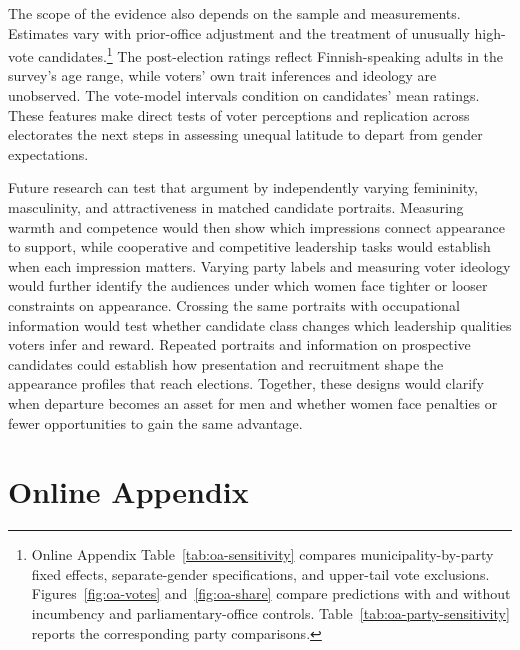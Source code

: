 \documentclass[11pt,a4paper]{article}\usepackage[]{graphicx}\usepackage[]{xcolor}
\begin{document}
The scope of the evidence also depends on the sample and measurements. Estimates vary with prior-office adjustment and the treatment of unusually high-vote candidates.\footnote{Online Appendix Table~\ref{tab:oa-sensitivity} compares municipality-by-party fixed effects, separate-gender specifications, and upper-tail vote exclusions. Figures~\ref{fig:oa-votes} and~\ref{fig:oa-share} compare predictions with and without incumbency and parliamentary-office controls. Table~\ref{tab:oa-party-sensitivity} reports the corresponding party comparisons.} The post-election ratings reflect Finnish-speaking adults in the survey's age range, while voters' own trait inferences and ideology are unobserved. The vote-model intervals condition on candidates' mean ratings. These features make direct tests of voter perceptions and replication across electorates the next steps in assessing unequal latitude to depart from gender expectations.

Future research can test that argument by independently varying femininity, masculinity, and attractiveness in matched candidate portraits. Measuring warmth and competence would then show which impressions connect appearance to support, while cooperative and competitive leadership tasks would establish when each impression matters. Varying party labels and measuring voter ideology would further identify the audiences under which women face tighter or looser constraints on appearance. Crossing the same portraits with occupational information would test whether candidate class changes which leadership qualities voters infer and reward. Repeated portraits and information on prospective candidates could establish how presentation and recruitment shape the appearance profiles that reach elections. Together, these designs would clarify when departure becomes an asset for men and whether women face penalties or fewer opportunities to gain the same advantage.

\newpage

\FloatBarrier
\printbibliography[title={References}]

\newpage


\FloatBarrier
\appendix
\section*{Online Appendix}
\setcounter{figure}{0}
\setcounter{table}{0}
\setcounter{equation}{0}
\renewcommand{\thefigure}{OA~\arabic{figure}}
\renewcommand{\thetable}{OA~\arabic{table}}
\renewcommand{\theequation}{OA~\arabic{equation}}
\renewcommand{\theHfigure}{oa.\arabic{figure}}
\renewcommand{\theHtable}{oa.\arabic{table}}
\renewcommand{\theHequation}{oa.\arabic{equation}}
\renewcommand{\thesection}{OA~\arabic{section}}
\setcounter{section}{0}
\end{document}
